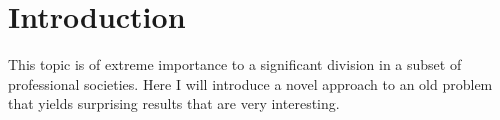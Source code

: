 \section{Introduction}

This topic is of extreme importance to a significant division in
a subset of professional societies. Here I will introduce a novel approach
to an old problem that yields surprising results that are very interesting.
